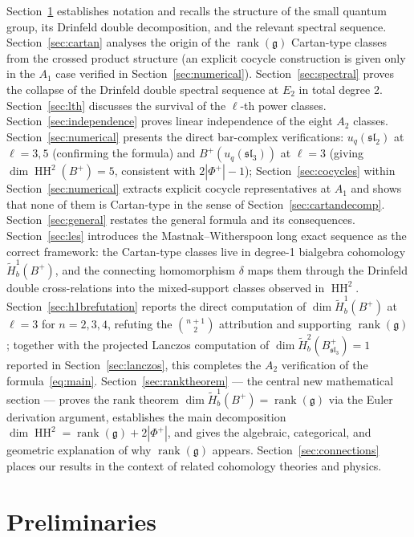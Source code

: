 \documentclass[11pt,letterpaper]{amsart}
\theoremstyle{plain}
\theoremstyle{definition}
\theoremstyle{remark}
\newcommand{\HH}{\operatorname{HH}}
\begin{document}
Section~\ref{sec:prelim} establishes notation and recalls the structure of the small quantum group, its Drinfeld double decomposition, and the relevant spectral sequence. Section~\ref{sec:cartan} analyses the origin of the $\operatorname{rank}(\mathfrak{g})$ Cartan-type classes from the crossed product structure (an explicit cocycle construction is given only in the $A_1$ case verified in Section~\ref{sec:numerical}). Section~\ref{sec:spectral} proves the collapse of the Drinfeld double spectral sequence at $E_2$ in total degree 2. Section~\ref{sec:lth} discusses the survival of the $\ell$-th power classes. Section~\ref{sec:independence} proves linear independence of the eight $A_2$ classes. Section~\ref{sec:numerical} presents the direct bar-complex verifications: $u_q(\mathfrak{sl}_2)$ at $\ell = 3, 5$ (confirming the formula) and $B^+(u_q(\mathfrak{sl}_3))$ at $\ell = 3$ (giving $\dim \HH^2(B^+) = 5$, consistent with $2|\Phi^+| - 1$); Section~\ref{sec:cocycles} within Section~\ref{sec:numerical} extracts explicit cocycle representatives at $A_1$ and shows that none of them is Cartan-type in the sense of Section~\ref{sec:cartandecomp}. Section~\ref{sec:general} restates the general formula and its consequences. Section~\ref{sec:les} introduces the Mastnak--Witherspoon long exact sequence as the correct framework: the Cartan-type classes live in degree-1 bialgebra cohomology $\tilde{H}^1_b(B^+)$, and the connecting homomorphism $\delta$ maps them through the Drinfeld double cross-relations into the mixed-support classes observed in $\HH^2$. Section~\ref{sec:h1brefutation} reports the direct computation of $\dim \tilde{H}^1_b(B^+)$ at $\ell = 3$ for $n = 2, 3, 4$, refuting the $\binom{n+1}{2}$ attribution and supporting $\operatorname{rank}(\mathfrak{g})$; together with the projected Lanczos computation of $\dim \tilde{H}^2_b(B^+_{\mathfrak{sl}_3}) = 1$ reported in Section~\ref{sec:lanczos}, this completes the $A_2$ verification of the formula~\eqref{eq:main}. Section~\ref{sec:ranktheorem} --- the central new mathematical section --- proves the rank theorem $\dim \tilde{H}^1_b(B^+) = \operatorname{rank}(\mathfrak{g})$ via the Euler derivation argument, establishes the main decomposition $\dim \HH^2 = \operatorname{rank}(\mathfrak{g}) + 2|\Phi^+|$, and gives the algebraic, categorical, and geometric explanation of why $\operatorname{rank}(\mathfrak{g})$ appears. Section~\ref{sec:connections} places our results in the context of related cohomology theories and physics.

\section{Preliminaries}
\label{sec:prelim}
\end{document}
